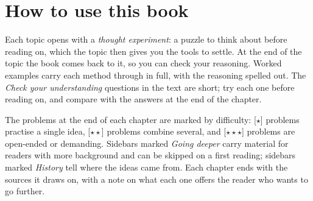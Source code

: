 \section*{How to use this book}

Each topic opens with a \emph{thought experiment}: a puzzle to think about
before reading on, which the topic then gives you the tools to settle. At the
end of the topic the book comes back to it, so you can check your reasoning.
Worked examples carry each method through in full, with the reasoning spelled
out. The \emph{Check your understanding} questions in the text are short; try
each one before reading on, and compare with the answers at the end of the
chapter.

The problems at the end of each chapter are marked by difficulty: [$\star$]
problems practise a single idea, [$\star\star$] problems combine several, and
[$\star\star\star$] problems are open-ended or demanding. Sidebars marked
\emph{Going deeper} carry material for readers with more background and can be
skipped on a first reading; sidebars marked \emph{History} tell where the ideas
came from. Each chapter ends with the sources it draws on, with a note on what
each one offers the reader who wants to go further.
